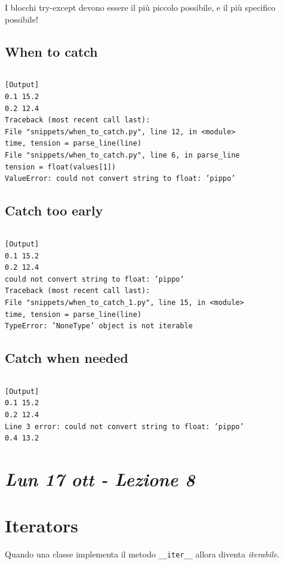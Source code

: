 I blocchi try-except devono essere il più piccolo possibile, e il più specifico possibile!


\subsection{When to catch}

\inputminted{python}{snippets/when_to_catch.py}
\begin{verbatim}
[Output]
0.1 15.2
0.2 12.4
Traceback (most recent call last):
File "snippets/when_to_catch.py", line 12, in <module>
time, tension = parse_line(line)
File "snippets/when_to_catch.py", line 6, in parse_line
tension = float(values[1])
ValueError: could not convert string to float: ’pippo’
\end{verbatim}

\subsection{Catch too early}

\inputminted{python}{snippets/when_to_catch_1.py}
\begin{verbatim}
[Output]
0.1 15.2
0.2 12.4
could not convert string to float: ’pippo’
Traceback (most recent call last):
File "snippets/when_to_catch_1.py", line 15, in <module>
time, tension = parse_line(line)
TypeError: ’NoneType’ object is not iterable
\end{verbatim}

\subsection{Catch when needed}

\inputminted{python}{snippets/when_to_catch_2.py}
\begin{verbatim}
[Output]
0.1 15.2
0.2 12.4
Line 3 error: could not convert string to float: ’pippo’
0.4 13.2
\end{verbatim}

\newpage
\section{\textit{Lun 17 ott - Lezione 8}}

\section{Iterators}

Quando una classe implementa il metodo \texttt{\_\_iter\_\_} allora diventa \textit{iterabile}.

